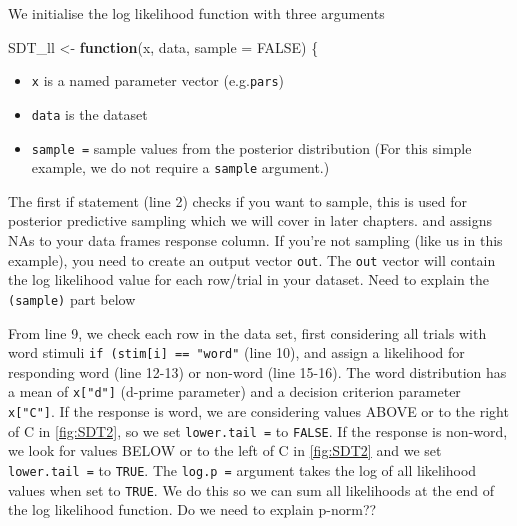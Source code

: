 \documentclass[]{book}
\newenvironment{Shaded}{\begin{snugshade}}{\end{snugshade}}
\newcommand{\ControlFlowTok}[1]{\textcolor[rgb]{0.13,0.29,0.53}{\textbf{#1}}}
\newcommand{\DataTypeTok}[1]{\textcolor[rgb]{0.13,0.29,0.53}{#1}}
\newcommand{\KeywordTok}[1]{\textcolor[rgb]{0.13,0.29,0.53}{\textbf{#1}}}
\newcommand{\NormalTok}[1]{#1}
\newcommand{\OperatorTok}[1]{\textcolor[rgb]{0.81,0.36,0.00}{\textbf{#1}}}
\newcommand{\OtherTok}[1]{\textcolor[rgb]{0.56,0.35,0.01}{#1}}
\newcommand{\StringTok}[1]{\textcolor[rgb]{0.31,0.60,0.02}{#1}}
\providecommand{\tightlist}{%
  \setlength{\itemsep}{0pt}\setlength{\parskip}{0pt}}
\begin{document}
We initialise the log likelihood function with three arguments

\begin{Shaded}
\begin{Highlighting}[numbers=left,,]
\NormalTok{SDT_ll <-}\StringTok{ }\ControlFlowTok{function}\NormalTok{(x, data, }\DataTypeTok{sample =} \OtherTok{FALSE}\NormalTok{) \{}
\end{Highlighting}
\end{Shaded}

\begin{itemize}
\tightlist
\item
  \texttt{x} is a named parameter vector (e.g.\texttt{pars})
\item
  \texttt{data} is the dataset
\item
  \texttt{sample\ =} sample values from the posterior distribution (For this simple example, we do not require a \texttt{sample} argument.)
\end{itemize}

The first if statement (line 2) checks if you want to sample, this is used for posterior predictive sampling which we will cover in later chapters. and assigns NAs to your data frames response column. If you're not sampling (like us in this example), you need to create an output vector \texttt{out}. The \texttt{out} vector will contain the log likelihood value for each row/trial in your dataset. Need to explain the \texttt{(sample)} part below

\begin{Shaded}
\end{Shaded}

From line 9, we check each row in the data set, first considering all trials with word stimuli \texttt{if\ (stim{[}i{]}\ ==\ "word"} (line 10), and assign a likelihood for responding word (line 12-13) or non-word (line 15-16). The word distribution has a mean of \texttt{x{[}"d"{]}} (d-prime parameter) and a decision criterion parameter \texttt{x{[}"C"{]}}. If the response is word, we are considering values ABOVE or to the right of C in \ref{fig:SDT2}, so we set \texttt{lower.tail\ =} to \texttt{FALSE}. If the response is non-word, we look for values BELOW or to the left of C in \ref{fig:SDT2} and we set \texttt{lower.tail\ =} to \texttt{TRUE}. The \texttt{log.p\ =} argument takes the log of all likelihood values when set to \texttt{TRUE}. We do this so we can sum all likelihoods at the end of the log likelihood function.
 Do we need to explain p-norm??
\end{document}

